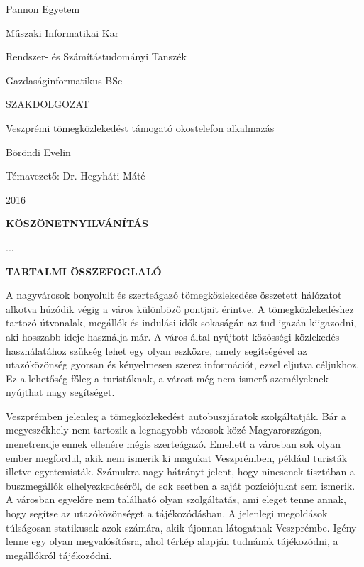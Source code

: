 \documentclass[a4paper,oneside,10pt]{report}
\begin{document}
\begin{titlepage}
\begin{center}
\Large
Pannon Egyetem

\vspace{10mm}
Műszaki Informatikai Kar

\vspace{10mm}
Rendszer- és Számítástudományi Tanszék

\vspace{10mm}
Gazdaságinformatikus BSc

\vspace{40mm}
\huge
SZAKDOLGOZAT

\vspace{10mm}
\LARGE
Veszprémi tömegközlekedést támogató okostelefon alkalmazás 

\vspace{10mm}
\Large
Böröndi Evelin

\vspace{40mm}
Témavezető: Dr. Hegyháti Máté

\vspace{10mm}
2016
\normalsize
\end{center}
\end{titlepage}



\pagestyle{empty} %



\newpage
\Large
\begin{center}
	\textbf{KÖSZÖNETNYILVÁNÍTÁS}
\end{center}
\normalsize
\noindent
...

\newpage
\Large
\begin{center}
	\textbf{TARTALMI ÖSSZEFOGLALÓ}
\end{center}
\normalsize
\noindent

A nagyvárosok bonyolult és szerteágazó tömegközlekedése összetett hálózatot alkotva húzódik végig a város különböző pontjait érintve.
A tömegközlekedéshez tartozó útvonalak, megállók és indulási idők sokaságán az tud igazán kiigazodni, aki hosszabb ideje használja már. 
A város által nyújtott közösségi közlekedés használatához szükség lehet egy olyan eszközre, amely segítségével az utazóközönség gyorsan és kényelmesen szerez információt, ezzel eljutva céljukhoz.
Ez a lehetőség főleg a turistáknak, a várost még nem ismerő személyeknek nyújthat nagy segítséget.

Veszprémben jelenleg a tömegközlekedést autobuszjáratok szolgáltatják.
Bár a megyeszékhely nem tartozik a legnagyobb városok közé Magyarországon, menetrendje ennek ellenére mégis szerteágazó.
Emellett a városban sok olyan ember megfordul, akik nem ismerik ki magukat Veszprémben, például turisták illetve egyetemisták.
Számukra nagy hátrányt jelent, hogy nincsenek tisztában a buszmegállók elhelyezkedéséről, de sok esetben a saját pozíciójukat sem ismerik.
A városban egyelőre nem található olyan szolgáltatás, ami eleget tenne annak, hogy segítse az utazóközönséget a tájékozódásban.
A jelenlegi megoldások túlságosan statikusak azok számára, akik újonnan látogatnak Veszprémbe.
Igény lenne egy olyan megvalósításra, ahol térkép alapján tudnának tájékozódni, a megállókról tájékozódni.
\end{document}
